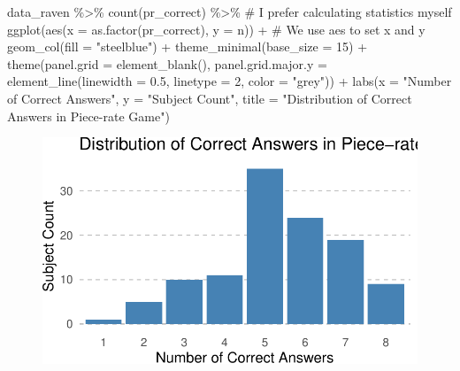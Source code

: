 \documentclass[
  letterpaper,
]{book}
\newenvironment{Shaded}{\begin{snugshade}}{\end{snugshade}}
\newcommand{\AttributeTok}[1]{\textcolor[rgb]{0.40,0.45,0.13}{#1}}
\newcommand{\CommentTok}[1]{\textcolor[rgb]{0.37,0.37,0.37}{#1}}
\newcommand{\DecValTok}[1]{\textcolor[rgb]{0.68,0.00,0.00}{#1}}
\newcommand{\FloatTok}[1]{\textcolor[rgb]{0.68,0.00,0.00}{#1}}
\newcommand{\FunctionTok}[1]{\textcolor[rgb]{0.28,0.35,0.67}{#1}}
\newcommand{\NormalTok}[1]{\textcolor[rgb]{0.00,0.23,0.31}{#1}}
\newcommand{\SpecialCharTok}[1]{\textcolor[rgb]{0.37,0.37,0.37}{#1}}
\newcommand{\StringTok}[1]{\textcolor[rgb]{0.13,0.47,0.30}{#1}}
\begin{document}
\begin{Shaded}
\begin{Highlighting}[]
\NormalTok{data\_raven }\SpecialCharTok{\%\textgreater{}\%} 
  \FunctionTok{count}\NormalTok{(pr\_correct) }\SpecialCharTok{\%\textgreater{}\%} \CommentTok{\# I prefer calculating statistics myself}
  \FunctionTok{ggplot}\NormalTok{(}\FunctionTok{aes}\NormalTok{(}\AttributeTok{x =} \FunctionTok{as.factor}\NormalTok{(pr\_correct), }\AttributeTok{y =}\NormalTok{ n)) }\SpecialCharTok{+} \CommentTok{\# We use aes to set x and y}
  \FunctionTok{geom\_col}\NormalTok{(}\AttributeTok{fill =} \StringTok{"steelblue"}\NormalTok{) }\SpecialCharTok{+}
  \FunctionTok{theme\_minimal}\NormalTok{(}\AttributeTok{base\_size =} \DecValTok{15}\NormalTok{) }\SpecialCharTok{+} 
  \FunctionTok{theme}\NormalTok{(}\AttributeTok{panel.grid =} \FunctionTok{element\_blank}\NormalTok{(), }
        \AttributeTok{panel.grid.major.y =} \FunctionTok{element\_line}\NormalTok{(}\AttributeTok{linewidth =} \FloatTok{0.5}\NormalTok{, }\AttributeTok{linetype =} \DecValTok{2}\NormalTok{, }\AttributeTok{color =} \StringTok{"grey"}\NormalTok{)) }\SpecialCharTok{+}
  \FunctionTok{labs}\NormalTok{(}\AttributeTok{x =} \StringTok{"Number of Correct Answers"}\NormalTok{, }
       \AttributeTok{y =} \StringTok{"Subject Count"}\NormalTok{, }
       \AttributeTok{title =} \StringTok{"Distribution of Correct Answers in Piece{-}rate Game"}\NormalTok{)}
\end{Highlighting}
\end{Shaded}

\begin{figure}[H]

{\centering \includegraphics{./data_viz_files/figure-pdf/unnamed-chunk-14-1.pdf}

}

\end{figure}
\end{document}
